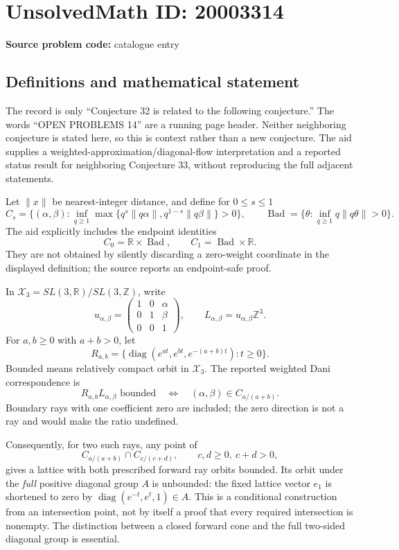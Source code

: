 \documentclass[11pt]{article}
\newcommand{\Z}{\mathbb{Z}}
\newcommand{\R}{\mathbb{R}}
\begin{document}
\section*{UnsolvedMath ID: 20003314}
\textbf{Source problem code:} catalogue entry
\subsection{Definitions and mathematical statement}
The record is only ``Conjecture 32 is related to the following conjecture.'' The words ``OPEN PROBLEMS 14'' are a running page header. Neither neighboring conjecture is stated here, so this is context rather than a new conjecture. The aid supplies a weighted-approximation/diagonal-flow interpretation and a reported status result for neighboring Conjecture 33, without reproducing the full adjacent statements.

Let $\|x\|$ be nearest-integer distance, and define for $0\leq s\leq1$
\[
 C_s=\{(\alpha,\beta):
 \inf_{q\geq1}\max\{q^s\|q\alpha\|,
                         q^{1-s}\|q\beta\|\}>0\},
 \qquad
 \operatorname{Bad}=\{\theta:\inf_{q\geq1}q\|q\theta\|>0\}.
\]
The aid explicitly includes the endpoint identities
\[
 C_0=\R\times\operatorname{Bad},\qquad
 C_1=\operatorname{Bad}\times\R.
\]
They are not obtained by silently discarding a zero-weight coordinate in the displayed definition; the source reports an endpoint-safe proof.

In $\mathcal X_3=SL(3,\R)/SL(3,\Z)$, write
\[
 u_{\alpha,\beta}=\begin{pmatrix}1&0&\alpha\\0&1&\beta\\0&0&1\end{pmatrix},
 \qquad L_{\alpha,\beta}=u_{\alpha,\beta}\Z^3.
\]
For $a,b\geq0$ with $a+b>0$, let
\[
 R_{a,b}=\{\operatorname{diag}(e^{at},e^{bt},e^{-(a+b)t}):t\geq0\}.
\]
Bounded means relatively compact orbit in $\mathcal X_3$. The reported weighted Dani correspondence is
\[
 R_{a,b}L_{\alpha,\beta}\text{ bounded}
 \quad\Longleftrightarrow\quad
 (\alpha,\beta)\in C_{a/(a+b)}.
\]
Boundary rays with one coefficient zero are included; the zero direction is not a ray and would make the ratio undefined.

Consequently, for two such rays, any point of
\[
 C_{a/(a+b)}\cap C_{c/(c+d)},\qquad c,d\geq0,\ c+d>0,
\]
gives a lattice with both prescribed forward ray orbits bounded. Its orbit under the \emph{full} positive diagonal group $A$ is unbounded: the fixed lattice vector $e_1$ is shortened to zero by $\operatorname{diag}(e^{-t},e^t,1)\in A$. This is a conditional construction from an intersection point, not by itself a proof that every required intersection is nonempty. The distinction between a closed forward cone and the full two-sided diagonal group is essential.
\end{document}
